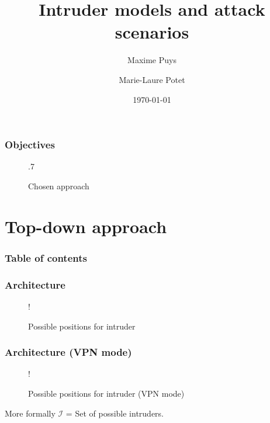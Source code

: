 \documentclass{beamer}
\title{Intruder models and attack scenarios}
\author{Maxime Puys \and Marie-Laure Potet}
\date{\today}
\begin{document}
\begin{frame}
    \maketitle
\end{frame}

\begin{frame}
    \frametitle{Objectives}

    \begin{figure}[htb]
        \centering
        \resizebox {!} {.7\textheight} {
            
        }
        \caption{Chosen approach}
    \end{figure}
\end{frame}

\section{Top-down approach}

\begin{frame}
    \frametitle{Table of contents}

    \tableofcontents[currentsection]
\end{frame}

\begin{frame}
    \frametitle{Architecture}

    \begin{figure}
        \centering
        \resizebox {\columnwidth} {!} {
            
        }
        \caption{Possible positions for intruder}
    \end{figure}
\end{frame}

\begin{frame}
    \frametitle{Architecture (VPN mode)}

    \begin{figure}
        \centering
        \resizebox {\columnwidth} {!} {
            
        }
        \caption{Possible positions for intruder (VPN mode)}
    \end{figure}
    \vfill
    \begin{block}{More formally}
        $\mathcal{I}$ = Set of possible intruders.
    \end{block}
\end{frame}
\end{document}
